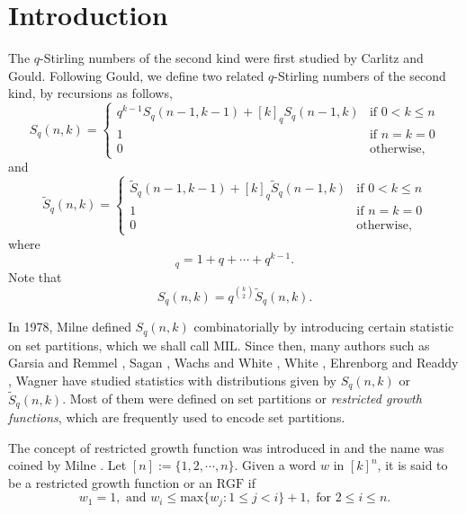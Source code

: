 \documentclass[12pt]{amsart}
\numberwithin{equation}{section}
\theoremstyle{plain}
\theoremstyle{definition}
\def\MIL{\mathrm{MIL}}
\def\RGF{\mathrm{RGF}}
\def\max{\mathrm{max}}
\begin{document}
\section{Introduction}\label{sec:intro}
The $q$-Stirling numbers of the second kind were first studied by Carlitz
\cite{Ca1,Ca2} and Gould\cite{Go}. Following Gould\cite{Go}, we define two related $q$-Stirling numbers of the second kind, by recursions as follows,
\begin{equation}\label{def-sq1}
S_q(n,k) = \left\{
  \begin{array}{ll}
q^{k-1}S_q(n-1,k-1)+[k]_q S_q(n-1,k) & \mbox{if $0 < k \leq n$}\\[6pt]
1 & \mbox{if $n=k=0$}\\[6pt]
0  & \mbox{otherwise,}
 \end{array} \right.
\end{equation}
and
\begin{equation}\label{def-sq2}
\widetilde{S}_q(n,k) = \left\{
  \begin{array}{ll}
\widetilde{S}_q(n-1,k-1)+[k]_q \widetilde{S}_q(n-1,k) & \mbox{if $0 < k \leq n$}\\[6pt]
1 & \mbox{if $n=k=0$}\\[6pt]
0  & \mbox{otherwise,}
 \end{array} \right.
\end{equation}
where
\begin{equation*}
  [k]_q=1+q+\cdots+q^{k-1}.
\end{equation*}
Note that
\begin{equation*}
  S_q(n,k)=q^{\binom{k}{2}} \widetilde{S}_q(n,k).
\end{equation*}

In 1978, Milne \cite{Mi} defined $S_q(n,k)$ combinatorially by introducing
certain statistic on set partitions, which we shall call $\MIL$.
Since then, many authors such as Garsia and Remmel \cite{GR}, Sagan \cite{Sa}, Wachs and White \cite{WW}, White \cite{Wh}, Ehrenborg and Readdy \cite{ER}, Wagner \cite{Wa} have studied statistics with distributions given by $S_q(n,k)$ or $\widetilde{S}_q(n,k)$. Most of them were defined on set partitions or \emph{restricted growth functions}, which are frequently used to encode set partitions.

The concept of restricted growth function was introduced in \cite{Hu,Wi} and the name was coined by Milne \cite{Mil}. Let $[n]:=\{1,2, \cdots, n\}$. Given a word $w$ in $[k]^n$, it is said to be a restricted growth function or an $\RGF$ if
$$w_1=1, \text{ and } w_i \leq \max\{w_j: 1 \leq j <i\} +1, \text{ for } 2\le i\le n.$$
\end{document}
